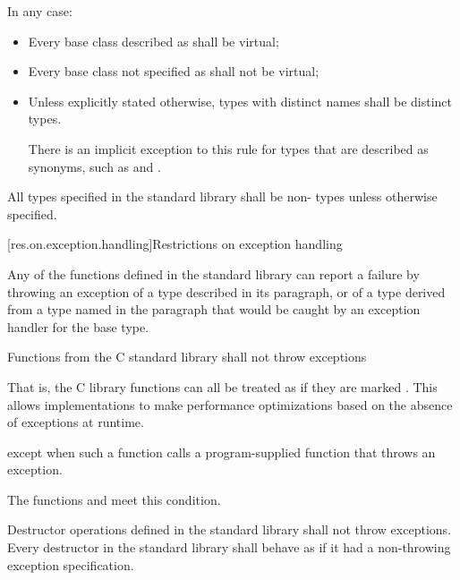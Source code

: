 \pnum
In any case:
\begin{itemize}
\item
Every base class described as
shall be virtual;
%
\item
Every base class not specified as
 shall not be virtual;
\item
Unless explicitly stated otherwise, types with distinct names shall be distinct
types.
\begin{note}
There is an implicit exception to this rule for types that are
described as synonyms, such as
 and
.
\end{note}
\end{itemize}

\pnum
All types specified in the \Cpp{} standard library shall be non- types
unless otherwise specified.

[res.on.exception.handling]{Restrictions on exception handling}%
%

\pnum
Any of the functions defined in the \Cpp{} standard library
%
can report a failure by throwing an exception of a type
described in its \throws paragraph,
or of a type derived from a type named in the \throws paragraph
that would be caught by an exception handler for the base type.

\pnum
Functions from the C standard library shall not throw exceptions%
%
\begin{footnote}
That is, the C
library functions can all be treated as if they
are marked .
This allows implementations to make performance optimizations
based on the absence of exceptions at runtime.
\end{footnote}
except when such a function calls a program-supplied function that throws an
exception.
\begin{footnote}
The functions
and
 meet this condition.
\end{footnote}

\pnum
Destructor operations defined in the \Cpp{} standard library
shall not throw exceptions.
Every destructor in the \Cpp{} standard library shall behave as if it had a
non-throwing exception specification.

